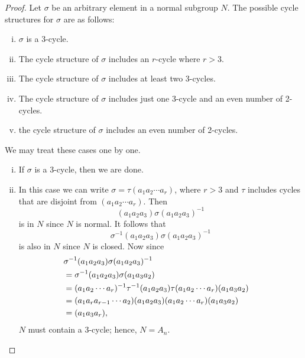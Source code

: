  
\begin{proof}
Let $\sigma$ be an arbitrary element in a normal subgroup $N$. The possible cycle structures for $\sigma$ are as follows:

\begin{enumerate}[(i)]
 \item
$\sigma$ is a 3-cycle.
 \item
The cycle structure of $\sigma$ includes an $r$-cycle where $r>3$.
\item
The cycle structure of $\sigma$ includes at least two 3-cycles.
\item
The cycle structure of $\sigma$ includes just one 3-cycle and an even number of 2-cycles. 
\item
the cycle structure of $\sigma$ includes an even
number of 2-cycles. 
\end{enumerate}

\noindent
We may treat these cases one by one.

\begin{enumerate}[(i)]
 \item
If $\sigma$ is a $3$-cycle, then we are done. 
\item
In this case we can write $\sigma = \tau(a_1 a_2 \cdots a_r)$, where $r>3$ 
and $\tau$ includes cycles that are disjoint from $(a_1 a_2 \cdots a_r)$.
Then   
\[
(a_1 a_2 a_3)\sigma(a_1 a_2 a_3)^{-1}
\]
is in $N$ since $N$ is normal. It follows that
\[
\sigma^{-1}(a_1 a_2 a_3)\sigma(a_1 a_2 a_3)^{-1}
\]
is also in $N$ since $N$ is closed. Now since
\begin{align*}
\lefteqn{\sigma^{-1}(a_1 a_2 a_3)\sigma(a_1 a_2 a_3)^{-1} } \\
& = \sigma^{-1}(a_1 a_2 a_3)\sigma(a_1 a_3 a_2) \\
& = (a_1 a_2 \cdots a_r)^{-1}\tau^{-1}(a_1 a_2 a_3) 
      \tau(a_1 a_2 \cdots a_r)(a_1 a_3 a_2) \\
& = (a_1 a_r a_{r-1} \cdots a_2 )(a_1 a_2 a_3) 
      (a_1 a_2 \cdots a_r)(a_1 a_3 a_2) \\
& = (a_1 a_3 a_r),
\end{align*}
$N$ must contain a 3-cycle; hence, $N = A_n$.
 

\end{enumerate}
\end{proof}
